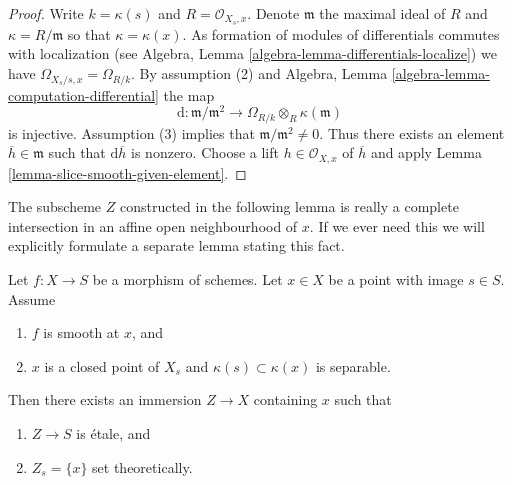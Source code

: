\begin{proof}
Write $k = \kappa(s)$ and $R = \mathcal{O}_{X_s, x}$.
Denote $\mathfrak m$ the maximal ideal of $R$ and
$\kappa = R/\mathfrak m$ so that $\kappa = \kappa(x)$.
As formation of modules of differentials commutes with localization (see
Algebra, Lemma \ref{algebra-lemma-differentials-localize})
we have $\Omega_{X_s/s, x} = \Omega_{R/k}$. By assumption (2) and
Algebra, Lemma \ref{algebra-lemma-computation-differential}
the map
$$
\text{d} :
\mathfrak m/\mathfrak m^2
\longrightarrow
\Omega_{R/k} \otimes_R \kappa(\mathfrak m)
$$
is injective. Assumption (3) implies that
$\mathfrak m/\mathfrak m^2 \not = 0$.
Thus there exists an element $\overline{h} \in \mathfrak m$
such that $\text{d}\overline{h}$ is nonzero. Choose a lift
$h \in \mathcal{O}_{X, x}$ of $\overline{h}$ and apply
Lemma \ref{lemma-slice-smooth-given-element}.
\end{proof}

\noindent
The subscheme $Z$ constructed in the following lemma is really a complete
intersection in an affine open neighbourhood of $x$. If we ever need this
we will explicitly formulate a separate lemma stating this fact.

\begin{lemma}
\label{lemma-slice-smooth}
Let $f : X \to S$ be a morphism of schemes.
Let $x \in X$ be a point with image $s \in S$.
Assume
\begin{enumerate}
\item $f$ is smooth at $x$, and
\item $x$ is a closed point of $X_s$ and $\kappa(s) \subset \kappa(x)$
is separable.
\end{enumerate}
Then there exists an immersion $Z \to X$ containing $x$ such that
\begin{enumerate}
\item $Z \to S$ is \'etale, and
\item $Z_s = \{x\}$ set theoretically.
\end{enumerate}
\end{lemma}

